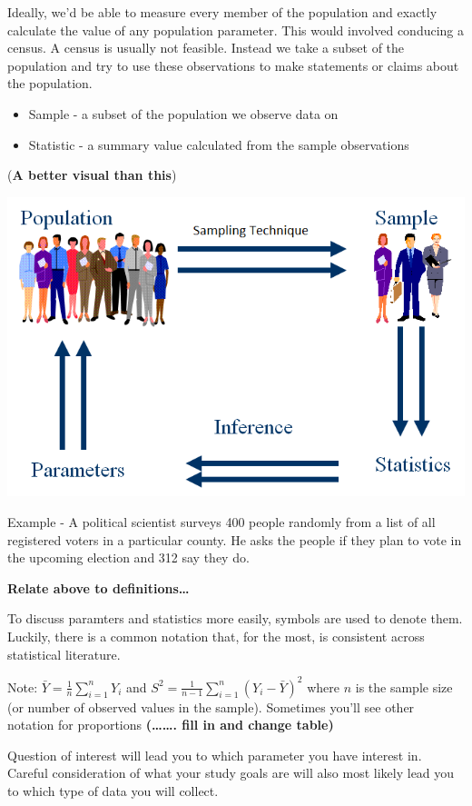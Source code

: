 \documentclass[
]{book}
\theoremstyle{definition}
\theoremstyle{definition}
\theoremstyle{definition}
\theoremstyle{remark}
\begin{document}
Ideally, we'd be able to measure every member of the population and exactly calculate the value of any population parameter. This would involved conducing a census. A census is usually not feasible. Instead we take a subset of the population and try to use these observations to make statements or claims about the population.

\begin{itemize}
\item
  Sample - a subset of the population we observe data on
\item
  Statistic - a summary value calculated from the sample observations
\end{itemize}

(\textbf{A better visual than this})

\begin{center}\includegraphics[width=0.8\linewidth]{img/paradigm} \end{center}

Example - A political scientist surveys 400 people randomly from a list of all registered voters in a particular county. He asks the people if they plan to vote in the upcoming election and 312 say they do.

\textbf{Relate above to definitions\ldots{}}

To discuss paramters and statistics more easily, symbols are used to denote them. Luckily, there is a common notation that, for the most, is consistent across statistical literature.

Note: \(\bar{Y}=\frac{1}{n}\sum_{i=1}^{n}Y_i\) and \(S^2=\frac{1}{n-1}\sum_{i=1}^{n}(Y_i-\bar{Y})^2\) where \(n\) is the sample size (or number of observed values in the sample). Sometimes you'll see other notation for proportions \textbf{(\ldots{}\ldots{}. fill in and change table)}

Question of interest will lead you to which parameter you have interest in. Careful consideration of what your study goals are will also most likely lead you to which type of data you will collect.
\end{document}
